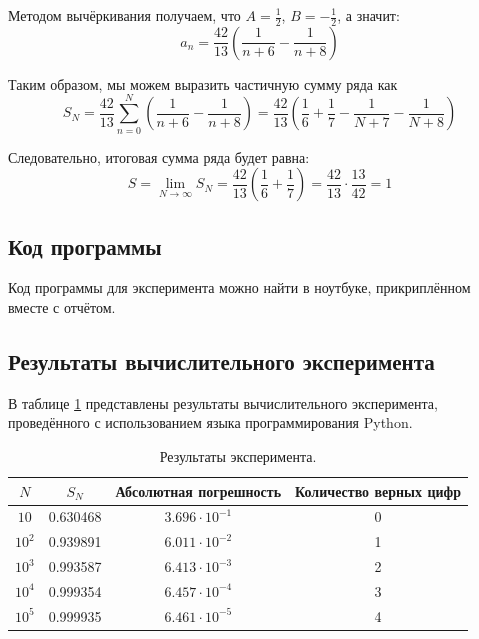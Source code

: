 \documentclass[12pt]{article}%
\begin{document}
Методом вычёркивания получаем, что $A = \frac{1}{2}$, $B = -\frac{1}{2}$, а значит:
\begin{equation*}
    a_n = \frac{42}{13}\left(\frac{1}{n+6} - \frac{1}{n+8} \right)
\end{equation*}

Таким образом, мы можем выразить частичную сумму ряда как
\begin{equation*}
    S_N = \frac{42}{13}\sum\limits_{n=0}^{N}
    \left(\frac{1}{n + 6} - \frac{1}{n + 8} \right) = 
    \frac{42}{13}\left(\frac{1}{6} + \frac{1}{7} 
    - \frac{1}{N + 7} - \frac{1}{N + 8} \right)
\end{equation*}

Следовательно, итоговая сумма ряда будет равна:
\begin{equation}
    S = \lim\limits_{N \rightarrow \infty} S_N = 
    \frac{42}{13}\left(\frac{1}{6} + \frac{1}{7}\right) = \frac{42}{13}\cdot \frac{13}{42} = 1
\end{equation}


\subsection{Код программы}
Код программы для  эксперимента можно найти в ноутбуке, прикриплённом вместе с отчётом.


\subsection{Результаты вычислительного эксперимента}
В таблице \ref{table:series_res} представлены результаты вычислительного эксперимента, проведённого с использованием языка программирования Python.

\begin{table}[!h]
\begin{center}
    \begin{tabular}{|c|c|c|c|}
    \hline  $N$  &  $S_N$  & Абсолютная погрешность & Количество верных цифр  \\
    \hline  $10$  & 0.630468 & $3.696 \cdot 10^{-1}$   & 0  \\            
    \hline  $10^2$ & 0.939891 & $6.011 \cdot 10^{-2}$  & 1  \\     
    \hline  $10^3$ & 0.993587 & $6.413 \cdot 10^{-3}$  & 2  \\
    \hline  $10^4$ & 0.999354 & $6.457 \cdot 10^{-4}$  & 3  \\
    \hline  $10^5$ & 0.999935 & $6.461 \cdot 10^{-5}$   & 4  \\
    \hline  
    \end{tabular}
    \caption{Результаты эксперимента.}\label{table:series_res}
\end{center}
\end{table}
\end{document}

